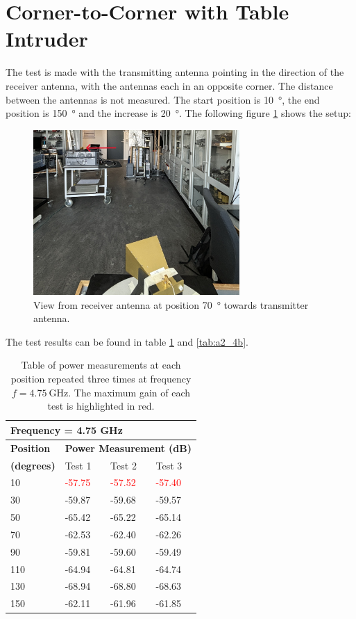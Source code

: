 \section{Corner-to-Corner with Table Intruder}
The test is made with the transmitting antenna pointing in the direction of the receiver antenna, with the antennas each in an opposite corner. The distance between the antennas is not measured. The start position is \SI{10}{\degree}, the end position is \SI{150}{\degree} and the increase is \SI{20}{\degree}. The following figure \ref{fig:a2_4} shows the setup:
\begin{figure}[H]
    \centering
    \includegraphics[width=0.7\textwidth]{figures/test_intruder_table.JPG}
    \caption{View from receiver antenna at position \SI{70}{\degree} towards transmitter antenna.} \label{fig:a2_4}
\end{figure}

The test results can be found in table \ref{tab:a2_4a} and \ref{tab:a2_4b}.
\begin{table}[H]
    \centering
    \begin{tabular}{l|l|l|l}
        \multicolumn{4}{l}{\textbf{Frequency = 4.75 GHz}}         \\
        \hline
        \textbf{Position} & \multicolumn{3}{l}{\textbf{Power Measurement (dB)}} \\
        \textbf{(degrees)}  & Test 1    & Test 2  & Test 3  \\
        \hline
        \hline
        10      & \textcolor{red}{-57.75}    & \textcolor{red}{-57.52}    & \textcolor{red}{-57.40} \\
        30      & -59.87    & -59.68    & -59.57 \\
        50      & -65.42    & -65.22    & -65.14 \\
        70      & -62.53    & -62.40    & -62.26 \\
        90      & -59.81    & -59.60    & -59.49 \\
        110     & -64.94    & -64.81    & -64.74 \\
        130     & -68.94    & -68.80    & -68.63 \\
        150     & -62.11    & -61.96    & -61.85
        \end{tabular}
    \caption{Table of power measurements at each position repeated three times at frequency $f=\SI{4.75}{\giga\hertz}$. The maximum gain of each test is highlighted in red.}
    \label{tab:a2_4a}
\end{table}

